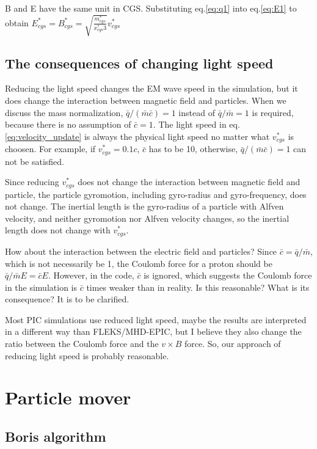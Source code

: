 \documentclass[a4paper, 11pt]{article}
\begin{document}
B and E have the same unit in CGS. Substituting eq.\ref{eq:q1} into eq.\ref{eq:E1} to obtain $E_{cgs}^* = B_{cgs}^* = \sqrt{\frac{m_{cgs}^*}{x_{cgs}^*3}}v_{cgs}^*$ 

\subsection{The consequences of changing light speed}

Reducing the light speed changes the EM wave speed in the simulation, but it does change the interaction between magnetic field and particles. When we discuss the mass normalization, $\bar{q}/(\bar{m}\bar{c}) = 1$ instead of $\bar{q}/\bar{m} = 1$ is required, because there is no assumption of $\bar{c}=1$. The light speed in eq.\ref{eq:velocity_update} is always the physical light speed no matter what $v_{cgs}^*$ is choosen. For example, if $v_{cgs}^* = 0.1c$, $\bar{c}$ has to be 10, otherwise, $\bar{q}/(\bar{m}\bar{c}) = 1$ can not be satisfied. 

Since reducing $v_{cgs}^*$ does not change the interaction between magnetic field and particle, the particle gyromotion, including gyro-radius and gyro-frequency, does not change. The inertial length is the gyro-radius of a particle with Alfven velocity, and neither gyromotion nor Alfven velocity changes, so the inertial length does not change with $v_{cgs}^*$.

How about the interaction between the electric field and particles? Since $\bar{c} = \bar{q}/\bar{m}$, which is not necessarily be 1, the Coulomb force for a proton should be $\bar{q}/\bar{m}E = \bar{c}E$. However, in the code, $\bar{c}$ is ignored, which suggests the Coulomb force in the simulation is $\bar{c}$ times weaker than in reality. Is this reasonable? What is its consequence? It is to be clarified. 

Most PIC simulations use reduced light speed, maybe the results are interpreted in a different way than FLEKS/MHD-EPIC, but I believe they also change the ratio between the Coulomb force and the $v \times B$ force. So, our approach of reducing light speed is probably reasonable. 

\section{Particle mover}

\subsection{Boris algorithm}
\end{document}
